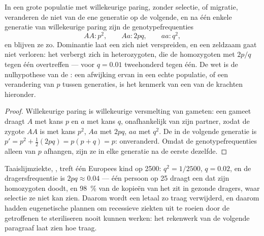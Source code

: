 \begin{theorem}\label{thm:b2:population-genetics:hw}
In een grote populatie met willekeurige paring, zonder selectie, 
of migratie, veranderen de  niet van de ene generatie op de
volgende, en na één enkele generatie van willekeurige paring zijn de
genotypefrequenties
\[
AA : p^{2}, \qquad Aa : 2pq, \qquad aa : q^{2},
\]
en blijven ze zo. Dominantie laat een   zich niet verspreiden,
en een zeldzaam   gaat niet verloren: het verbergt zich in
heterozygoten, die de homozygoten met $2p/q$ tegen één overtreffen --- voor
$q = 0.01$ tweehonderd tegen één. De wet is de nulhypothese van de
: een afwijking ervan in een echte populatie, of een
verandering van $p$ tussen generaties, is het kenmerk van een van de
krachten hieronder.
\end{theorem}
\begin{proof}
Willekeurige paring is willekeurige versmelting van gameten: een gameet draagt
$A$ met kans $p$ en $a$ met kans $q$, onafhankelijk van zijn
partner, zodat de zygote $AA$ is met kans $p^{2}$, $Aa$ met
$2pq$, $aa$ met $q^{2}$. De  in de volgende
generatie is $p' = p^{2} + \tfrac12(2pq) = p(p + q) = p$: onveranderd.
Omdat de genotypefrequenties alleen van $p$ afhangen, zijn ze in elke
generatie na de eerste dezelfde.
\end{proof}

\begin{example}\label{ex:b2:population-genetics:cf}
Taaislijmziekte, , treft één Europees kind op 2500:
$q^{2} = 1/2500$, $q = 0.02$, en de dragersfrequentie is $2pq
\approx 0.04$ --- één persoon op 25 draagt een  dat zijn
homozygoten doodt, en \qty{98}{\%} van de kopieën van het  zit in
gezonde dragers, waar selectie ze niet kan zien. Daarom wordt een letaal
  zo traag verwijderd, en daarom hadden eugenetische plannen om
recessieve ziekten uit te roeien door de getroffenen te steriliseren nooit
kunnen werken: het rekenwerk van de volgende paragraaf laat zien hoe traag.
\end{example}


